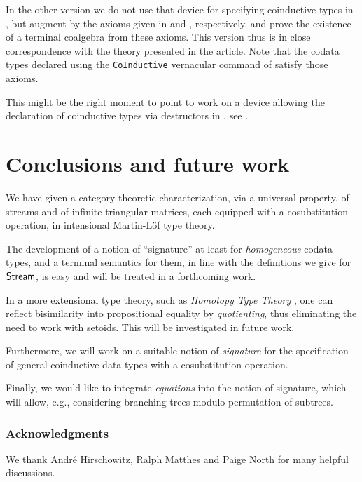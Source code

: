 \documentclass[envcountsame]{llncs}
\begin{document}
\begin{Long}
In the other version we do not use that device for specifying coinductive types in \coq, but augment \coq by the axioms given in  and ,
respectively, and prove the existence of a terminal coalgebra from these axioms.
This version thus is in close correspondence with the theory presented in the article.
Note that the codata types declared using the \lstinline!CoInductive! vernacular command of \coq satisfy those axioms.

This might be the right moment to point to work on a device allowing the declaration of coinductive types via destructors in \agda, 
see \parencite{DBLP:conf/popl/AbelPTS13}.

\end{Long}

\section{Conclusions and future work}



We have given a category-theoretic characterization, via a universal property, of streams and of infinite triangular matrices,
each equipped with a cosubstitution operation,
in intensional Martin-L\"of type theory.

The development of a notion of \enquote{signature} at least for \emph{homogeneous} codata types, and 
a terminal semantics for them, in line with the definitions we give for $\mathsf{Stream}$, is easy
and will be treated in a forthcoming work.

In a more extensional type theory, such as \emph{Homotopy Type Theory} \parencite{hottbook}, 
one can reflect bisimilarity into propositional equality by \emph{quotienting},
thus eliminating the need to work with setoids.
This will be investigated in future work.

Furthermore, we will work on a suitable notion of \emph{signature} for the specification of general coinductive data types with
a cosubstitution operation.

Finally, we would like to integrate \emph{equations} into the notion of signature, which 
will allow, e.g., considering branching trees modulo permutation of subtrees.
 

\begin{Long}
 
\subsubsection*{Acknowledgments}
 We thank André Hirschowitz, Ralph Matthes and Paige North for many helpful discussions.

\end{Long}
 
\printbibliography


\appendix




\end{document}
